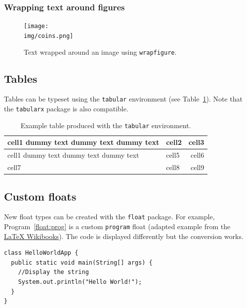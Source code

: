 \subsubsection{Wrapping text around figures}
\label{float:wrap}

\begin{figure}
    \centering
    \texttt{[image: \\img/coins.png]}
    \caption{Text wrapped around an image using \texttt{wrapfigure}.}
    \label{fig:wrap}
\end{figure}

\lipsum[1-2]


\subsection{Tables}
\label{float:tab}

Tables can be typeset using the \verb|tabular| environment (see Table~\ref{tab:tabular}). Note that the \verb|tabularx| package is also compatible.

\begin{table}
    \centering
    \begin{tabular}{| l | l | r |} 
      \hline
      cell1 dummy text dummy text dummy text & cell2 & cell3 \\ 
      \hline
      cell1 dummy text dummy text dummy text & cell5 & cell6 \\ 
      \hline
      cell7 & cell8 & cell9 \\ 
      \hline
    \end{tabular}

    \caption{Example table produced with the \texttt{tabular} environment.}
    \label{tab:tabular}
\end{table}


\subsection{Custom floats}
\label{float:custom}

New float types can be created with the \verb|float| package. For example, Program~\ref{float:prog} is a custom \verb|program| float (adapted example from the \href{https://en.wikibooks.org/wiki/LaTeX/Floats,_Figures_and_Captions}{LaTeX Wikibooks}). The code is displayed differently but the conversion works.

\begin{program}
  \begin{verbatim}
class HelloWorldApp {
  public static void main(String[] args) {
    //Display the string
    System.out.println("Hello World!");
  }
}
\end{verbatim}
  \caption{The Hello World! program in Java.}
  \label{float:prog}
\end{program}


